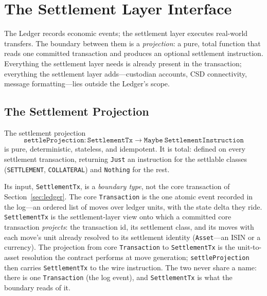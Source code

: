 \section{The Settlement Layer Interface}
\label{sec:sec12}
\label{sec:settlement}

The Ledger records economic events; the settlement layer executes real-world transfers. The boundary between them is a \emph{projection}: a pure, total function that reads one committed transaction and produces an optional settlement instruction. Everything the settlement layer needs is already present in the transaction; everything the settlement layer adds---custodian accounts, CSD connectivity, message formatting---lies outside the Ledger's scope.

\subsection{The Settlement Projection}
\label{sec:settlement-projection}

\begin{definition}
\label{def:settle-projection}
The settlement projection
\[
\texttt{settleProjection} : \texttt{SettlementTx} \to \texttt{Maybe}\ \texttt{SettlementInstruction}
\]
is pure, deterministic, stateless, and idempotent. It is total: defined on every settlement transaction, returning \texttt{Just} an instruction for the settlable classes (\texttt{SETTLEMENT}, \texttt{COLLATERAL}) and \texttt{Nothing} for the rest.
\end{definition}

Its input, \texttt{SettlementTx}, is a \emph{boundary type}, not the core transaction of Section~\ref{sec:ledger}. The core \texttt{Transaction} is the one atomic event recorded in the log---an ordered list of moves over ledger units, with the state delta they ride. \texttt{SettlementTx} is the settlement-layer view onto which a committed core transaction \emph{projects}: the transaction id, its settlement class, and its moves with each move's unit already resolved to its settlement identity (\texttt{Asset}---an ISIN or a currency). The projection from core \texttt{Transaction} to \texttt{SettlementTx} is the unit-to-asset resolution the contract performs at move generation; \texttt{settleProjection} then carries \texttt{SettlementTx} to the wire instruction. The two never share a name: there is one \texttt{Transaction} (the log event), and \texttt{SettlementTx} is what the boundary reads of it.

